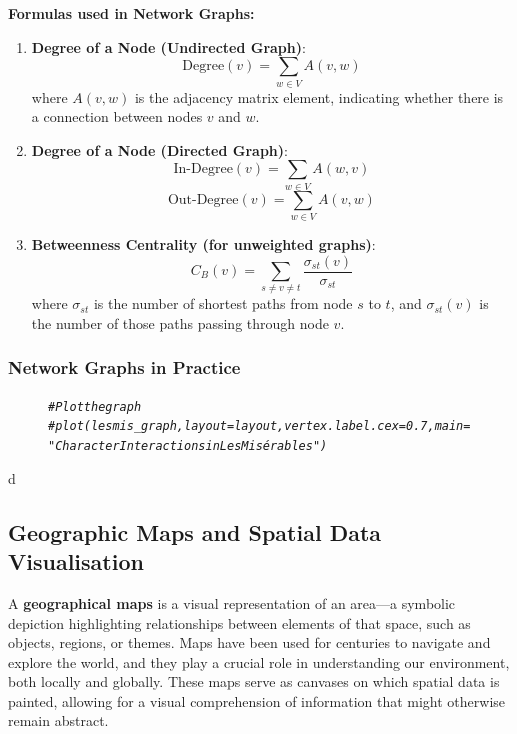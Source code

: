 \documentclass{article}\usepackage[]{graphicx}\usepackage[]{xcolor}
\makeatletter
\newcommand{\hlcom}[1]{\textcolor[rgb]{0.678,0.584,0.686}{\textit{#1}}}%
\newenvironment{kframe}{%
 \def\at@end@of@kframe{}%
 \ifinner\ifhmode%
  \def\at@end@of@kframe{\end{minipage}}%
  \begin{minipage}{\columnwidth}%
 \fi\fi%
 \def\FrameCommand##1{\hskip\@totalleftmargin \hskip-\fboxsep
 \colorbox{shadecolor}{##1}\hskip-\fboxsep
     \hskip-\linewidth \hskip-\@totalleftmargin \hskip\columnwidth}%
 \MakeFramed {\advance\hsize-\width
   \@totalleftmargin\z@ \linewidth\hsize
   \@setminipage}}%
 {\par\unskip\endMakeFramed%
 \at@end@of@kframe}
\newenvironment{knitrout}{}{} %
\makeatother
\begin{document}
\noindent
\textbf{Formulas used in Network Graphs:}

\begin{enumerate}
\item \textbf{Degree of a Node (Undirected Graph)}:
\[
\text{Degree}(v) = \sum_{w \in V} A(v, w)
\]
where \(A(v, w)\) is the adjacency matrix element, indicating whether there is a connection between nodes \(v\) and \(w\).
\item \textbf{Degree of a Node (Directed Graph)}:
\[
\text{In-Degree}(v) = \sum_{w \in V} A(w, v)
\]
\[
\text{Out-Degree}(v) = \sum_{w \in V} A(v, w)
\]
\item \textbf{Betweenness Centrality (for unweighted graphs)}:
\[
C_B(v) = \sum_{s \neq v \neq t} \frac{\sigma_{st}(v)}{\sigma_{st}}
\]
where \(\sigma_{st}\) is the number of shortest paths from node \(s\) to \(t\), and \(\sigma_{st}(v)\) is the number of those paths passing through node \(v\).
\end{enumerate}

\subsubsection{Network Graphs in Practice}




\begin{figure}[h]
\centering
\begin{knitrout}\scriptsize
{}\color{fgcolor}\begin{kframe}
\begin{alltt}
\hlcom{# Plot the graph}
\hlcom{#plot(lesmis_graph, layout = layout, vertex.label.cex = 0.7, main = "Character Interactions in Les Misérables")}
\end{alltt}
\end{kframe}
\end{knitrout}
\end{figure}
d
\subsection{Geographic Maps and Spatial Data Visualisation}

A \textbf{geographical maps} is a visual representation of an area—a symbolic depiction highlighting relationships between elements of that space, such as objects, regions, or themes. Maps have been used for centuries to navigate and explore the world, and they play a crucial role in understanding our environment, both locally and globally. These maps serve as canvases on which spatial data is painted, allowing for a visual comprehension of information that might otherwise remain abstract.\\
\end{document}
